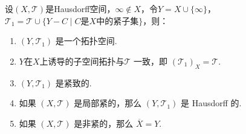 \begin{theorem}[单点紧化定理][thm:6.2]
    设$(X, \mathcal{T})$是Hausdorff空间，$\infty \notin X$，令$Y = X \cup \{\infty\}$，$\mathcal{T}_1 = \mathcal{T} \cup \{Y-C \mid C\text{是}X\text{中}\text{的}\text{紧}\text{子集}\}$，则： \par
    \begin{enumerate}[(1)]
        \item $(Y, \mathcal{T}_1)$ 是一个拓扑空间.
        \item $Y$在$X$上诱导的子空间拓扑与$\mathcal{T}$ 一致，即 $(\mathcal{T}_1)_X = \mathcal{T}$.
        \item $(Y, \mathcal{T}_1)$ 是紧致的.
        \item 如果 $(X, \mathcal{T})$ 是局部紧的，那么 $(Y, \mathcal{T}_1)$ 是 Hausdorff 的.
        \item 如果 $(X, \mathcal{T})$ 是非紧的，那么 $\overline{X} = Y$.
    \end{enumerate}
\end{theorem}
